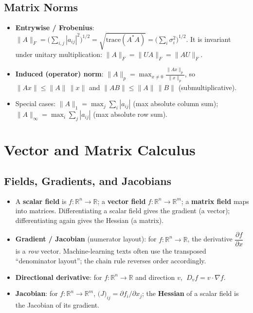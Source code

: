 \documentclass[hidelinks]{article}
\begin{document}
\subsection{Matrix Norms}
\begin{itemize}
    \item \textbf{Entrywise / Frobenius}: $\displaystyle \|A\|_F = \Big(\sum_{i,j}|a_{ij}|^2\Big)^{1/2} = \sqrt{\mathrm{trace}(A^{*}A)} = \Big(\sum_i \sigma_i^2\Big)^{1/2}$. It is invariant under unitary multiplication: $\|A\|_F = \|UA\|_F = \|AU\|_F$.
    \item \textbf{Induced (operator) norm}: $\displaystyle \|A\|_p = \max_{x\neq 0}\frac{\|Ax\|_p}{\|x\|_p}$, so $\|Ax\|\le \|A\|\,\|x\|$ and $\|AB\|\le\|A\|\,\|B\|$ (submultiplicative).
    \item Special cases: $\|A\|_1 = \max_j \sum_i |a_{ij}|$ (max absolute column sum); $\|A\|_\infty = \max_i\sum_j|a_{ij}|$ (max absolute row sum).
\end{itemize}

\section{Vector and Matrix Calculus}

\subsection{Fields, Gradients, and Jacobians}
\begin{itemize}
    \item A \textbf{scalar field} is $f:\mathbb{R}^n\to\mathbb{R}$; a \textbf{vector field} $f:\mathbb{R}^n\to\mathbb{R}^m$; a \textbf{matrix field} maps into matrices. Differentiating a scalar field gives the gradient (a vector); differentiating again gives the Hessian (a matrix).
    \item \textbf{Gradient / Jacobian} (numerator layout): for $f:\mathbb{R}^n\to\mathbb{R}$, the derivative $\dfrac{\partial f}{\partial x}$ is a \emph{row} vector. Machine-learning texts often use the transposed ``denominator layout''; the chain rule reverses order accordingly.
    \item \textbf{Directional derivative}: for $f:\mathbb{R}^n\to\mathbb{R}$ and direction $v$, $\;D_v f = v\cdot\nabla f$.
    \item \textbf{Jacobian}: for $f:\mathbb{R}^n\to\mathbb{R}^m$, $\big(J\big)_{ij} = \partial f_i/\partial x_j$; the \textbf{Hessian} of a scalar field is the Jacobian of its gradient.
\end{itemize}
\end{document}
